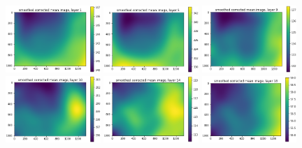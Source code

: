 \documentclass[letterpaper,11pt]{article}
\begin{document}
\begin{figure}[!ht]
\centering
\includegraphics[width=0.32\textwidth]{images/results/unmasked_smoothed_corrected_mean_image_layers_vectra/unmasked_smoothed_corrected_mean_image_layer_1}
\includegraphics[width=0.32\textwidth]{images/results/unmasked_smoothed_corrected_mean_image_layers_vectra/unmasked_smoothed_corrected_mean_image_layer_5}
\includegraphics[width=0.32\textwidth]{images/results/unmasked_smoothed_corrected_mean_image_layers_vectra/unmasked_smoothed_corrected_mean_image_layer_9}
\includegraphics[width=0.32\textwidth]{images/results/unmasked_smoothed_corrected_mean_image_layers_vectra/unmasked_smoothed_corrected_mean_image_layer_10}
\includegraphics[width=0.32\textwidth]{images/results/unmasked_smoothed_corrected_mean_image_layers_vectra/unmasked_smoothed_corrected_mean_image_layer_14}
\includegraphics[width=0.32\textwidth]{images/results/unmasked_smoothed_corrected_mean_image_layers_vectra/unmasked_smoothed_corrected_mean_image_layer_18}

\end{figure}
\end{document}
